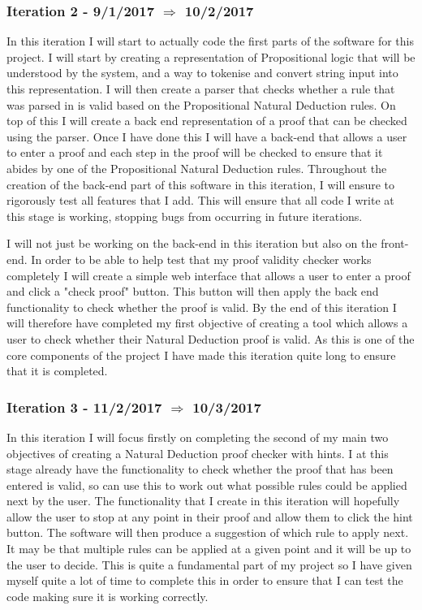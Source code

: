 \subsubsection{Iteration 2 - 9/1/2017 $\Rightarrow$ 10/2/2017}

In this iteration I will start to actually code the first parts of the software for this project. I will start by creating a representation of Propositional logic that will be understood by the system, and a way to tokenise and convert string input into this representation. I will then create a parser that checks whether a rule that was parsed in is valid based on the Propositional Natural Deduction rules. On top of this I will create a back end representation of a proof that can be checked using the parser. Once I have done this I will have a back-end that allows a user to enter a proof and each step in the proof will be checked to ensure that it abides by one of the Propositional Natural Deduction rules. Throughout the creation of the back-end part of this software in this iteration, I will ensure to rigorously test all features that I add. This will ensure that all code I write at this stage is working, stopping bugs from occurring in future iterations. 

I will not just be working on the back-end in this iteration but also on the front-end. In order to be able to help test that my proof validity checker works completely I will create a simple web interface that allows a user to enter a proof and click a "check proof" button. This button will then apply the back end functionality to check whether the proof is valid. By the end of this iteration I will therefore have completed my first objective of creating a tool which allows a user to check whether their Natural Deduction proof is valid. As this is one of the core components of the project I have made this iteration quite long to ensure that it is completed.

\subsubsection{Iteration 3 - 11/2/2017 $\Rightarrow$ 10/3/2017}

In this iteration I will focus firstly on completing the second of my main two objectives of creating a Natural Deduction proof checker with hints. I at this stage already have the functionality to check whether the proof that has been entered is valid, so can use this to work out what possible rules could be applied next by the user. The functionality that I create in this iteration will hopefully allow the user to stop at any point in their proof and allow them to click the hint button. The software will then produce a suggestion of which rule to apply next. It may be that multiple rules can be applied at a given point and it will be up to the user to decide. This is quite a fundamental part of my project so I have given myself quite a lot of time to complete this in order to ensure that I can test the code making sure it is working correctly.

